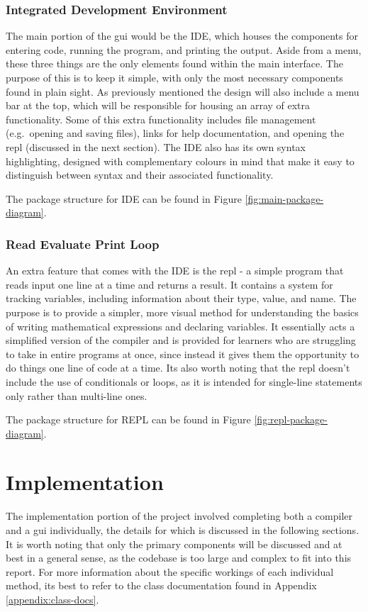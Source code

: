\documentclass[
]{report}
\begin{document}
\subsection{Integrated Development Environment}
The main portion of the \acrshort{gui} would be the IDE, which houses the
components for entering code, running the program, and printing the
output. Aside from a menu, these three things are the only elements
found within the main interface. The purpose of this is to keep it
simple, with only the most necessary components found in plain sight. As
previously mentioned the design will also include a menu bar at the top,
which will be responsible for housing an array of extra functionality.
Some of this extra functionality includes file management (e.g.~opening
and saving files), links for help documentation, and opening the \acrshort{repl}
(discussed in the next section). The IDE also has its own syntax
highlighting, designed with complementary colours in mind that make it
easy to distinguish between syntax and their associated functionality.

The package structure for IDE can be found in Figure \ref{fig:main-package-diagram}.

\subsection{Read Evaluate Print Loop}
An extra feature that comes with the IDE is the \acrshort{repl} - a simple program
that reads input one line at a time and returns a result. It contains a
system for tracking variables, including information about their type,
value, and name. The purpose is to provide a simpler, more visual method
for understanding the basics of writing mathematical \glspl{expression} and
declaring variables. It essentially acts a simplified version of the
compiler and is provided for learners who are struggling to take in
entire programs at once, since instead it gives them the opportunity to
do things one line of code at a time. Its also worth noting that the
\acrshort{repl} doesn't include the use of conditionals or loops, as it is intended
for single-line \glspl{statement} only rather than multi-line ones.

The package structure for REPL can be found in Figure \ref{fig:repl-package-diagram}.

\chapter{Implementation}
The implementation portion of the project involved completing both a
compiler and a \acrshort{gui} individually, the details for which is discussed in
the following sections. It is worth noting that only the primary
components will be discussed and at best in a general sense, as the
codebase is too large and complex to fit into this report. For more
information about the specific workings of each individual method, its
best to refer to the class documentation found in Appendix \ref{appendix:class-docs}.
\end{document}

